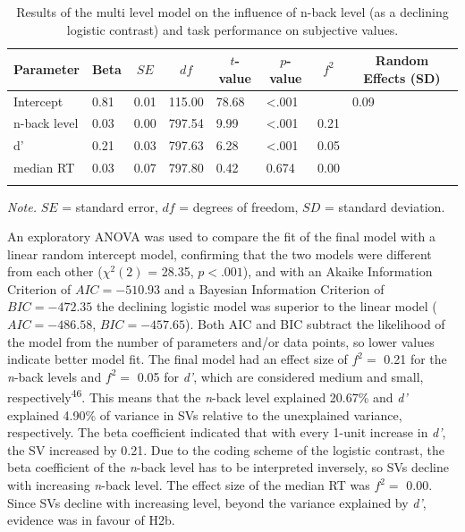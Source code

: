 \documentclass[
  man,floatsintext]{apa6}
\begin{document}
\begin{table}[H]

\begin{center}
\begin{threeparttable}

\caption{\label{tab:H2b-results}Results of the multi level model on the influence of n-back level (as a declining logistic contrast) and task performance on subjective values.}

\begin{tabular}{llllllll}
\toprule
Parameter & \multicolumn{1}{c}{Beta} & \multicolumn{1}{c}{$SE$} & \multicolumn{1}{c}{$df$} & \multicolumn{1}{c}{$t$-value} & \multicolumn{1}{c}{$p$-value} & \multicolumn{1}{c}{$f^{2}$} & \multicolumn{1}{c}{Random Effects (SD)}\\
\midrule
Intercept & 0.81 & 0.01 & 115.00 & 78.68 & <.001 &  & 0.09\\
n-back level & 0.03 & 0.00 & 797.54 & 9.99 & <.001 & 0.21 & \\
d' & 0.21 & 0.03 & 797.63 & 6.28 & <.001 & 0.05 & \\
median RT & 0.03 & 0.07 & 797.80 & 0.42 & 0.674 & 0.00 & \\
\bottomrule
\addlinespace
\end{tabular}

\begin{tablenotes}[para]
\normalsize{\textit{Note.} $SE$ = standard error, $df$ = degrees of freedom, $SD$ = standard deviation.}
\end{tablenotes}

\end{threeparttable}
\end{center}

\end{table}

An exploratory ANOVA was used to compare the fit of the final model with a linear random intercept model, confirming that the two models were different from each other (\(\chi^2 (2)\) = 28.35, \(p<.001\)), and with an Akaike Information Criterion of \(AIC=-510.93\) and a Bayesian Information Criterion of \(BIC=-472.35\) the declining logistic model was superior to the linear model (\(AIC=-486.58\), \(BIC=-457.65\)).
Both AIC and BIC subtract the likelihood of the model from the number of parameters and/or data points, so lower values indicate better model fit.
The final model had an effect size of \(f^{2}=\) 0.21 for the \emph{n}-back levels and \(f^{2}=\) 0.05 for \emph{d'}, which are considered medium and small, respectively\textsuperscript{46}.
This means that the \emph{n}-back level explained 20.67\% and \emph{d'} explained 4.90\% of variance in SVs relative to the unexplained variance, respectively.
The beta coefficient indicated that with every 1-unit increase in \emph{d'}, the SV increased by 0.21.
Due to the coding scheme of the logistic contrast, the beta coefficient of the \emph{n}-back level has to be interpreted inversely, so SVs decline with increasing \emph{n}-back level.
The effect size of the median RT was \(f^{2}=\) 0.00.
Since SVs decline with increasing level, beyond the variance explained by \emph{d'}, evidence was in favour of H2b.
\end{document}
